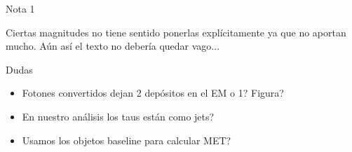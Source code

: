 \vspace{2cm}


{\LARGE Nota 1}

Ciertas magnitudes no tiene sentido ponerlas explícitamente ya que no aportan mucho. Aún así el texto no debería quedar vago...


\vspace{2cm}


{\LARGE Dudas}

\begin{itemize}
	\item Fotones convertidos dejan 2 depósitos en el EM o 1? Figura?
	\item En nuestro análisis los taus están como jets?
	\item Usamos los objetos baseline para calcular MET?
\end{itemize}